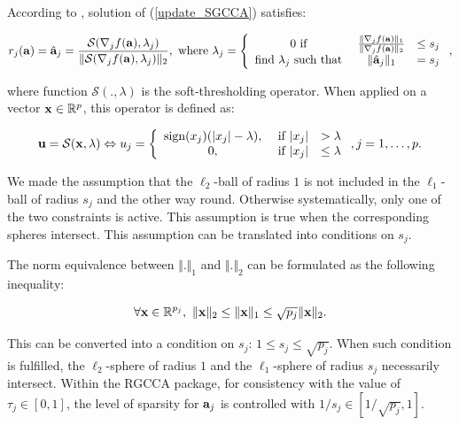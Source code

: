 \documentclass[
]{jss}
\begin{document}
According to \citep{Witten2009a}, solution of (\ref{update_SGCCA})
satisfies:

\begin{equation}
    r_j(\mathbf{a}) = \hat{\mathbf{a}}_j = \frac{\mathcal{S}(\nabla_j f(\mathbf{a}), \lambda_j)}{\Vert \mathcal{S}(\nabla_j f(\mathbf{a}), \lambda_j)\Vert_2}, ~\text{where}~ \lambda_j = \left\lbrace\begin{array}{ccc}
    0 ~ \text{if}~ & \frac{\Vert \nabla_j f(\mathbf{a}) \Vert_1}{\Vert \nabla_j f(\mathbf{a}) \Vert_2} & \leq s_j\\
    \text{find}~ \lambda_j ~\text{such that}~ & \Vert \hat{\mathbf{a}}_j \Vert_1 & = s_j \end{array}\right.,
    \label{SGCCA_sol}
\end{equation}

where function \(\mathcal{S}(., \lambda)\) is the soft-thresholding
operator. When applied on a vector \(\mathbf{x}\in\mathbb{R}^p\), this operator
is defined as:

\begin{equation}
    \mathbf{u} = \mathcal{S}(\mathbf{x}, \lambda) \Leftrightarrow u_j = \left\lbrace
    \begin{array}{ccc}
        \mathrm{sign}(x_j)(|x_j| -  \lambda), &~ \text{if}~ |x_j| &> \lambda\\
        0, &~ \text{if}~ |x_j| &\leq \lambda\\ 
    \end{array}\right., j = 1, \ldots, p.
\end{equation}

We made the assumption that the \(\ell_2\)-ball of radius \(1\) is not
included in the \(\ell_1\)-ball of radius \(s_j\) and the other way
round. Otherwise systematically, only one of the two constraints is
active. This assumption is true when the corresponding spheres
intersect. This assumption can be translated into conditions on \(s_j\).

The norm equivalence between \(\Vert . \Vert_1\) and \(\Vert . \Vert_2\)
can be formulated as the following inequality:

\begin{equation}
    \forall \mathbf{x} \in \mathbb{R}^{p_j}, ~ \Vert \mathbf{x} \Vert_2 \leq \Vert \mathbf{x} \Vert_1 \leq \sqrt{p_j}\Vert \mathbf{x} \Vert_2.
\label{existence_conditions}
\end{equation}

This can be converted into a condition on \(s_j\):
\(1 \leq s_j \leq \sqrt{p_j}\). When such condition is fulfilled, the
\(\ell_2\)-sphere of radius \(1\) and the \(\ell_1\)-sphere of radius
\(s_j\) necessarily intersect. Within the RGCCA package, for consistency
with the value of \(\tau_j \in [0, 1]\), the level of sparsity for
\(\mathbf{a}_j\) is controlled with \(1/s_j \in [1/\sqrt{p_j}, 1]\).
\end{document}

